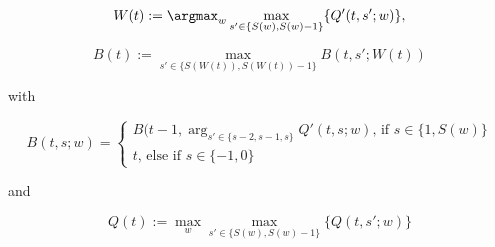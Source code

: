 \[
W(t) := \argmax_w\max_{s' \in \{S(w),S(w)-1\}}\{Q'(t,s';w)\},
\]

\[
B(t) := \max_{s' \in \{S(W(t)),S(W(t))-1\}}B(t,s';W(t))
\]

with 

\[
B(t,s;w) = 
\begin{cases}
	B(t-1,\arg_{s' \in \{ s-2, s-1, s\}}Q'(t,s;w) \text{, if } s \in \{1,S(w)\} \\
	t \text{, else if } s \in \{-1,0\}
\end{cases}
\]

and 

\[
Q(t) := \max_w\max_{s' \in \{S(w),S(w)-1\}}\{Q(t,s';w)\}
\]




